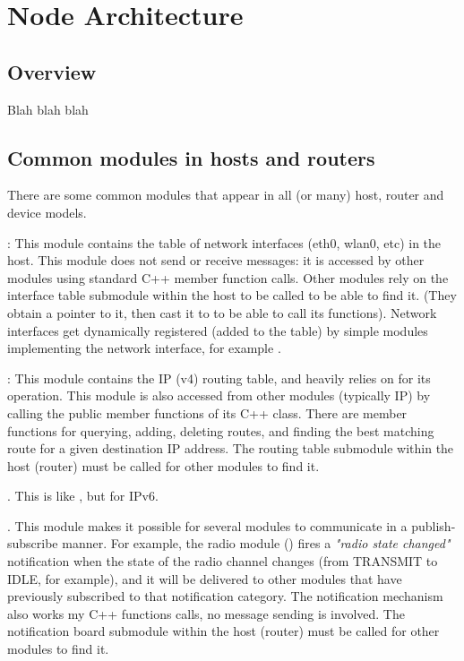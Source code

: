 \chapter{Node Architecture}
\label{cha:node-architecture}


\section{Overview}

Blah blah blah



\section{Common modules in hosts and routers}

There are some common modules that appear in all (or many) host, router and device
models.

:
This module contains the table of network interfaces
(eth0, wlan0, etc) in the host. This module does not send or receive messages:
it is accessed by other modules using standard C++ member function calls.
Other modules rely on the interface table submodule within the host to be called
 to be able to find it. (They obtain a 
pointer to it, then cast it to  to be able to call its
functions). Network interfaces get dynamically registered (added to the table)
by simple modules implementing the network interface, for example .

:
This module contains the IP (v4) routing table, and heavily relies
on  for its operation. This module is also accessed from other
modules (typically IP) by calling the public member functions of its C++ class.
There are member functions for querying, adding, deleting routes, and
finding the best matching route for a given destination IP address.
The routing table submodule within the host (router) must be called
 for other modules to find it.

. This is like , but for IPv6.

. This module makes it possible for several modules to
communicate in a publish-subscribe manner. For example, the radio module
() fires a \textit{"radio state changed"} notification when
the state of the radio channel changes (from TRANSMIT to IDLE, for example),
and it will be delivered to other modules that have previously subscribed
to that notification category. The notification mechanism also works
my C++ functions calls, no message sending is involved.
The notification board submodule within the host (router) must be called
 for other modules to find it.


